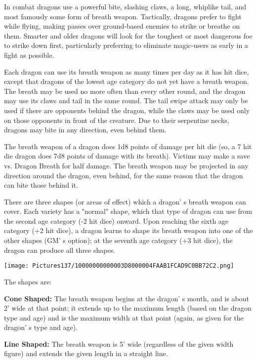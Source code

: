 \documentclass[a4paper,twoside,openany,10pt]{book}
\begin{document}
\begin{multicols}{2}
In combat dragons use a powerful bite, slashing claws, a long, whiplike tail, and most famously some form of breath weapon. Tactically, dragons prefer to fight while flying, making passes over ground-based enemies to strike or breathe on them. Smarter and older dragons will look for the toughest or most dangerous foe to strike down first, particularly preferring to eliminate magic-users as early in a fight as possible.

Each dragon can use its breath weapon as many times per day as it has hit dice, except that dragons of the lowest age category do not yet have a breath weapon. The breath may be used no more often than every other round, and the dragon may use its claws and tail in the same round. The tail swipe attack may only be used if there are opponents behind the dragon, while the claws may be used only on those opponents in front of the creature. Due to their serpentine necks, dragons may bite in any direction, even behind them.

The breath weapon of a dragon does 1d8 points of damage per hit die (so, a 7 hit die dragon does 7d8 points of damage with its breath). Victims may make a save vs. Dragon Breath for half damage. The breath weapon may be projected in any direction around the dragon, even behind, for the same reason that the dragon can bite those behind it.

There are three shapes (or areas of effect) which a dragon' s breath weapon can cover. Each variety has a "normal" shape, which that type of dragon can use from the second age category (-2 hit dice) onward. Upon reaching the sixth age category (+2 hit dice), a dragon learns to shape its breath weapon into one of the other shapes (GM' s option); at the seventh age category (+3 hit dice), the dragon can produce all three shapes.


\begin{center}
	\texttt{[image: Pictures137/10000000000003D8000004FAAB1FCAD9C0BB72C2.png]}
\end{center}\medskip

The shapes are:

\textbf{Cone Shaped:} The breath weapon begins at the dragon' s mouth, and is about 2' wide at that point; it extends up to the maximum length (based on the dragon type and age) and is the maximum width at that point (again, as given for the dragon' s type and age).

\textbf{Line Shaped: } The breath weapon is 5' wide (regardless of the given width figure) and extends the given length in a straight line.


\end{multicols}
\end{document}
